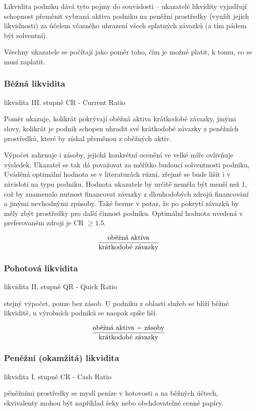 Likvidita podniku dává tyto pojmy do souvislosti -- ukazatelé likvidity vyjadřují schopnost přeměnit vybraná aktiva podniku na peněžní prostředky (využít jejich likvidnosti) za účelem včasného uhrazení všech splatných závazků (a tím pádem být solventní).

Všechny ukazatele se počítají jako poměr toho, čím je možné platit, k tomu, co se musí zaplatit.

\subsubsection{Běžná likvidita} 
likvidita III. stupně
CR - Current Ratio

Poměr ukazuje, kolikrát pokrývají oběžná aktiva krátkodobé závazky, jinými slovy, kolikrát je podnik schopen uhradit své krátkodobé závazky z peněžních prostředků, které by získal přeměnou z oběžných aktiv.

Výpočet zahrnuje i zásoby, jejichž konkrétní ocenění ve velké míře ovlivňuje výsledek.
Ukazatel se tak dá považovat za měřítko budoucí solventnosti podniku, Uváděná optimální hodnota se v literaturách různí, zřejmě se bude lišit i v závisloti na typu podniku. Hodnota ukazatele by určitě neměla být menší než 1, což by znamenalo nutnost financovat závazky z dlouhodobých zdrojů financování a jinými nevhodnými způsoby. Také berme v potaz, že po pokrytí závazků by měly zbýt prostředky pro další činnost podniku.
Optimální hodnota uvedená v preferovaném zdroji je CR $\geq 1.5$. 

$$\dfrac{\text{oběžná aktiva}}{\text{krátkodobé závazky}}$$

\subsubsection{Pohotová likvidita} 
likvidita II. stupně
QR - Quick Ratio

stejný výpočet, pouze bez zásob. U podniku z oblasti služeb se blíží běžné likviditě, u výrobních podniků se naopak spíše liší.

$$\dfrac{\text{oběžná aktiva $-$ zásoby}}{\text{krátkodobé závazky}}$$

\subsubsection{Peněžní (okamžitá) likvidita}
likvidita I. stupně
CR - Cash Ratio

pěněžními prostředky se myslí peníze v hotovosti a na běžných účtech, ekvivalenty mohou být například šeky nebo obchdovatelné cenné papíry.

